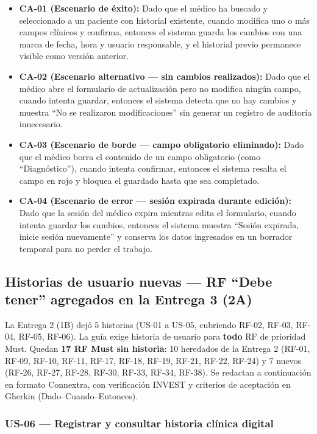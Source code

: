 \documentclass[11pt,a4paper]{article}
\providecommand{\tightlist}{%
	\setlength{\itemsep}{0pt}\setlength{\parskip}{0pt}}
\begin{document}
	\begin{itemize}
		\tightlist
		\item
		\textbf{CA-01 (Escenario de éxito):} Dado que el médico ha buscado y seleccionado a un paciente con historial existente, cuando modifica uno o más campos clínicos y confirma, entonces el sistema guarda los cambios con una marca de fecha, hora y usuario responsable, y el historial previo permanece visible como versión anterior.
		\item
		\textbf{CA-02 (Escenario alternativo --- sin cambios realizados):} Dado que el médico abre el formulario de actualización pero no modifica ningún campo, cuando intenta guardar, entonces el sistema detecta que no hay cambios y muestra ``No se realizaron modificaciones'' sin generar un registro de auditoría innecesario.
		\item
		\textbf{CA-03 (Escenario de borde --- campo obligatorio eliminado):} Dado que el médico borra el contenido de un campo obligatorio (como ``Diagnóstico''), cuando intenta confirmar, entonces el sistema resalta el campo en rojo y bloquea el guardado hasta que sea completado.
		\item
		\textbf{CA-04 (Escenario de error --- sesión expirada durante edición):} Dado que la sesión del médico expira mientras edita el formulario, cuando intenta guardar los cambios, entonces el sistema muestra ``Sesión expirada, inicie sesión nuevamente'' y conserva los datos ingresados en un borrador temporal para no perder el trabajo.
	\end{itemize}
	
	\subsection{Historias de usuario nuevas --- RF ``Debe tener'' agregados en la Entrega 3 (2A)}
	
	La Entrega 2 (1B) dejó 5 historias (US-01 a US-05, cubriendo RF-02, RF-03, RF-04, RF-05, RF-06). La guía exige historia de usuario para \textbf{todo} RF de prioridad Must. Quedan \textbf{17 RF Must sin historia}: 10 heredados de la Entrega 2 (RF-01, RF-09, RF-10, RF-11, RF-17, RF-18, RF-19, RF-21, RF-22, RF-24) y 7 nuevos (RF-26, RF-27, RF-28, RF-30, RF-33, RF-34, RF-38). Se redactan a continuación en formato Connextra, con verificación INVEST y criterios de aceptación en Gherkin (Dado--Cuando--Entonces).
	
	\subsubsection{US-06 --- Registrar y consultar historia clínica digital}
	
\end{document}
